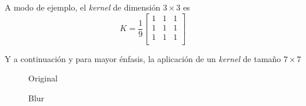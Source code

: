 A modo de ejemplo, el \emph{kernel} de dimensión $3\times3$ es
\begin{equation*}
  K = \frac{1}{9}
  \begin{bmatrix}
    1 & 1 & 1 \\
    1 & 1 & 1 \\
    1 & 1 & 1 \\
  \end{bmatrix}
\end{equation*}

Y a continuación y para mayor énfasis, la aplicación de un
\emph{kernel} de tamaño $7 \times 7$

\begin{figure}[H]
  \caption{Original}
  \centering \setlength\fboxsep{0pt} \setlength\fboxrule{0.5pt}
\end{figure}

\begin{figure}[H]
  \centering \setlength\fboxsep{0pt} \setlength\fboxrule{0.5pt}
  \caption{Blur}
\end{figure}

